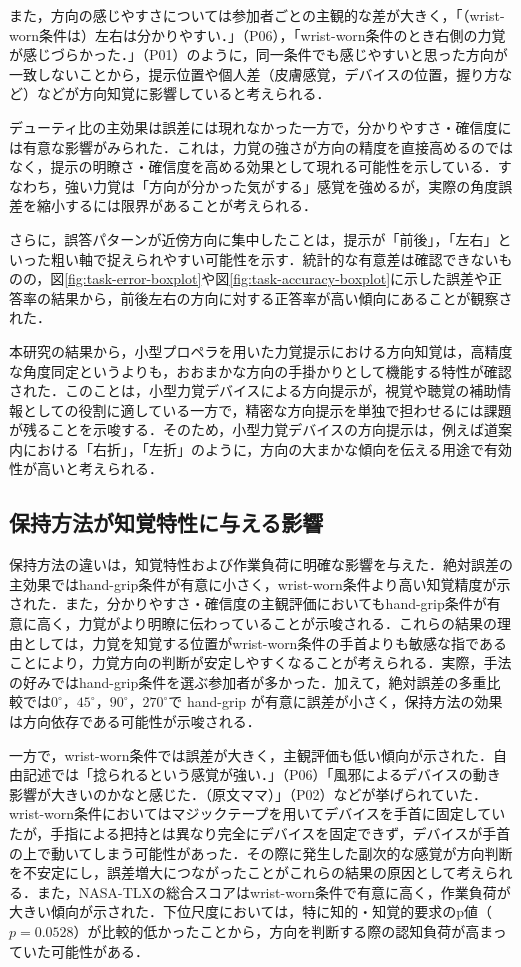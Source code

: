 \documentclass[a4paper,11pt]{jreport}
\begin{document}
また，方向の感じやすさについては参加者ごとの主観的な差が大きく，「（wrist-worn条件は）左右は分かりやすい．」（P06），「wrist-worn条件のとき右側の力覚が感じづらかった．」（P01）のように，同一条件でも感じやすいと思った方向が一致しないことから，提示位置や個人差（皮膚感覚，デバイスの位置，握り方など）などが方向知覚に影響していると考えられる．

デューティ比の主効果は誤差には現れなかった一方で，分かりやすさ・確信度には有意な影響がみられた．これは，力覚の強さが方向の精度を直接高めるのではなく，提示の明瞭さ・確信度を高める効果として現れる可能性を示している．すなわち，強い力覚は「方向が分かった気がする」感覚を強めるが，実際の角度誤差を縮小するには限界があることが考えられる．

さらに，誤答パターンが近傍方向に集中したことは，提示が「前後」，「左右」といった粗い軸で捉えられやすい可能性を示す．統計的な有意差は確認できないものの，図\ref{fig:task-error-boxplot}や図\ref{fig:task-accuracy-boxplot}に示した誤差や正答率の結果から，前後左右の方向に対する正答率が高い傾向にあることが観察された．

本研究の結果から，小型プロペラを用いた力覚提示における方向知覚は，高精度な角度同定というよりも，おおまかな方向の手掛かりとして機能する特性が確認された．このことは，小型力覚デバイスによる方向提示が，視覚や聴覚の補助情報としての役割に適している一方で，精密な方向提示を単独で担わせるには課題が残ることを示唆する．そのため，小型力覚デバイスの方向提示は，例えば道案内における「右折」，「左折」のように，方向の大まかな傾向を伝える用途で有効性が高いと考えられる．

\subsection{保持方法が知覚特性に与える影響}
保持方法の違いは，知覚特性および作業負荷に明確な影響を与えた．絶対誤差の主効果ではhand-grip条件が有意に小さく，wrist-worn条件より高い知覚精度が示された．また，分かりやすさ・確信度の主観評価においてもhand-grip条件が有意に高く，力覚がより明瞭に伝わっていることが示唆される．これらの結果の理由としては，力覚を知覚する位置がwrist-worn条件の手首よりも敏感な指であることにより，力覚方向の判断が安定しやすくなることが考えられる．実際，手法の好みではhand-grip条件を選ぶ参加者が多かった．加えて，絶対誤差の多重比較では$0^\circ$，$45^\circ$，$90^\circ$，$270^\circ$で hand-grip が有意に誤差が小さく，保持方法の効果は方向依存である可能性が示唆される．

一方で，wrist-worn条件では誤差が大きく，主観評価も低い傾向が示された．自由記述では「捻られるという感覚が強い．」（P06）「風邪によるデバイスの動き影響が大きいのかなと感じた．（原文ママ）」（P02）などが挙げられていた．wrist-worn条件においてはマジックテープを用いてデバイスを手首に固定していたが，手指による把持とは異なり完全にデバイスを固定できず，デバイスが手首の上で動いてしまう可能性があった．その際に発生した副次的な感覚が方向判断を不安定にし，誤差増大につながったことがこれらの結果の原因として考えられる．また，NASA-TLXの総合スコアはwrist-worn条件で有意に高く，作業負荷が大きい傾向が示された．下位尺度においては，特に知的・知覚的要求のp値（$p = 0.0528$）が比較的低かったことから，方向を判断する際の認知負荷が高まっていた可能性がある．
\end{document}

